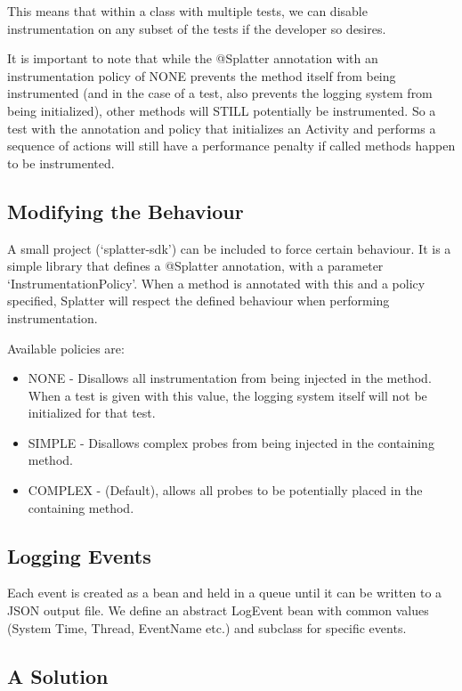 This means that within a class with multiple tests, we can disable
instrumentation on any subset of the tests if the developer so desires.

It is important to note that while the @Splatter annotation with an
instrumentation policy of NONE prevents the method itself from being
instrumented (and in the case of a test, also prevents the logging system from
being initialized), other methods will STILL potentially be instrumented. So a
test with the annotation and policy that initializes an Activity and performs a
sequence of actions will still have a performance penalty if called methods
happen to be instrumented.


\subsection{Modifying the Behaviour}

A small project ({\lq}splatter-sdk{\rq}) can be included to force certain
behaviour. It is a simple library that defines a @Splatter annotation, with a
parameter {\lq}InstrumentationPolicy{\rq}. When a method is annotated with this
and a policy specified, Splatter will respect the defined behaviour when
performing instrumentation.

Available policies are:

\begin{itemize}
  \item NONE - Disallows all instrumentation from being injected in the method.
  When a test is given with this value, the logging system itself will not be
  initialized for that test.
  \item SIMPLE - Disallows complex probes from being injected in the containing
  method.
  \item COMPLEX - (Default), allows all probes to be potentially placed in the
  containing method.
\end{itemize}


\subsection{Logging Events}

Each event is created as a bean and held in a queue until it can be written to a
JSON output file. We define an abstract LogEvent bean with common values (System
Time, Thread, EventName etc.) and subclass for specific events.

\subsection{A Solution}


